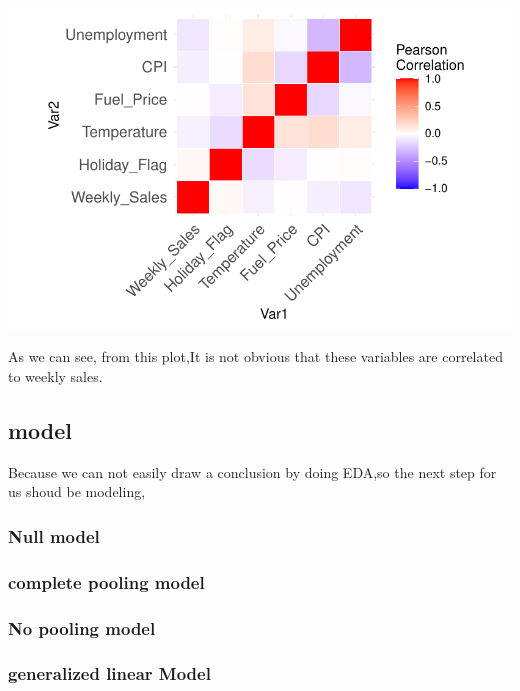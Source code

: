 \documentclass[
  letterpaper,
  DIV=11,
  numbers=noendperiod]{scrartcl}
\begin{document}
\includegraphics{678final_files/figure-pdf/unnamed-chunk-8-1.pdf}

As we can see, from this plot,It is not obvious that these variables are
correlated to weekly sales.

\hypertarget{model}{%
\subsection{model}\label{model}}

Because we can not easily draw a conclusion by doing EDA,so the next
step for us shoud be modeling,

\hypertarget{null-model}{%
\subsubsection{Null model}\label{null-model}}

\hypertarget{complete-pooling-model}{%
\subsubsection{complete pooling model}\label{complete-pooling-model}}

\hypertarget{no-pooling-model}{%
\subsubsection{No pooling model}\label{no-pooling-model}}

\hypertarget{generalized-linear-model}{%
\subsubsection{generalized linear
Model}\label{generalized-linear-model}}
\end{document}
